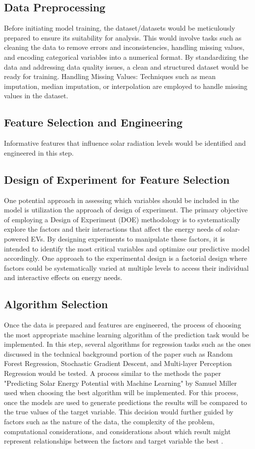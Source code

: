 \documentclass[10pt,twocolumn]{article}
\begin{document}
\subsection{Data Preprocessing}
Before initiating model training, the dataset/datasets would be meticulously prepared to ensure its suitability for analysis. This would involve tasks such as cleaning the data to remove errors and inconsistencies, handling missing values, and encoding categorical variables into a numerical format. By standardizing the data and addressing data quality issues, a clean and structured dataset would be ready for training.
Handling Missing Values: Techniques such as mean imputation, median imputation, or interpolation are employed to handle missing values in the dataset.
\subsection{Feature Selection and Engineering}
Informative features that influence solar radiation levels would be identified and engineered in this step. 

\subsection{Design of Experiment for Feature Selection}
One potential approach in assessing which variables should be included in the model is utilization the approach of design of experiment. The primary objective of employing a Design of Experiment (DOE) methodology is to systematically explore the factors and their interactions that affect the energy needs of solar-powered EVs. By designing experiments to manipulate these factors, it is intended to identify the most critical variables and optimize our predictive model accordingly. One approach to the experimental design is a factorial design where factors could be systematically varied at multiple levels to access their individual and interactive effects on energy needs. 
\subsection{Algorithm Selection}
Once the data is prepared and features are engineered, the process of choosing the  most appropriate machine learning algorithm of the prediction task would be implemented. In this step, several algorithms for regression tasks such as the ones discussed in the technical background portion of the paper such as  Random Forest Regression, Stochastic Gradient Descent, and Multi-layer Perception Regression would be tested. A process similar to the methods the paper "Predicting Solar Energy Potential with Machine Learning" by Samuel Miller used when choosing the best algorithm will be implemented. For this process, once the models are used to generate predictions the results will be compared to the true values of the target variable.  This decision would further guided by factors such as the nature of the data, the complexity of the problem, computational considerations, and considerations about which result might represent relationships between the factors and target variable the best .
\end{document}
